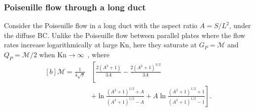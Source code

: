 \subsubsection{Poiseuille flow through a long duct}

Consider the Poiseuille flow in a long duct with the aspect ratio $A=S/L^2$, under the diffuse BC. Unlike the Poiseuille flow between parallel plates where the flow rates increase logarithmically at large $\text{Kn}$, here they saturate at $G_P=\mathcal{M}$ and $Q_P=\mathcal{M}/2$ when $\text{Kn}\rightarrow\infty$~\cite{loyalka1976}, where 
\begin{equation}\label{Mass_flow_rate_fm}
\begin{aligned}[b]
\mathcal{M}=\frac{1}{4\sqrt{\pi}}&\left[\frac{2(A^3+1)}{3A}-\frac{2(A^2+1)^{3/2}}{3A} \right. \\
&\left.
 +\ln\frac{(A^2+1)^{1/2}+A}{(A^2+1)^{1/2}-A}+A\ln\frac{(A^2+1)^{1/2}+1}{(A^2+1)^{1/2}-1} \right].
\end{aligned}
\end{equation}

